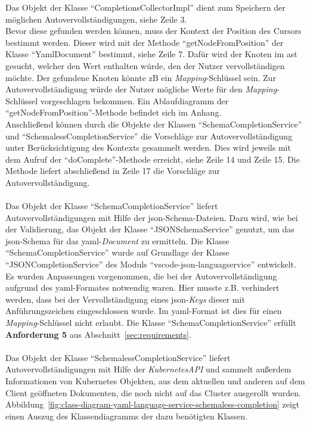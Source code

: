 Das Objekt der Klasse ``CompletionsCollectorImpl'' dient zum Speichern der möglichen Autovervollständigungen, siehe Zeile 3.
\\
Bevor diese gefunden werden können, muss der Kontext der Position des Cursors bestimmt werden.
Dieser wird mit der Methode ``getNodeFromPosition'' der Klasse ``YamlDocument'' bestimmt, siehe Zeile 7.
Dafür wird der Knoten im \ac{ast} gesucht, welcher den Wert enthalten würde, den der Nutzer vervollständigen möchte.
Der gefundene Knoten könnte \ac{zB} ein \textit{Mapping}-Schlüssel sein.
Zur Autovervollständigung würde der Nutzer mögliche Werte für den \textit{Mapping}-Schlüssel vorgeschlagen bekommen.
Ein Ablaufdiagramm der ``getNodeFromPosition''-Methode befindet sich im Anhang.
\\
Anschließend können durch die Objekte der Klassen ``SchemaCompletionService'' und ``SchemalessCompletionService''
die Vorschläge zur Autovervollständigung unter Berücksichtigung des Kontexts gesammelt werden.
Dies wird jeweils mit dem Aufruf der ``doComplete''-Methode erreicht, siehe Zeile 14 und Zeile 15.
Die Methode liefert abschließend in Zeile 17 die Vorschläge zur Autovervollständigung.
\\
\\
Das Objekt der Klasse ``SchemaCompletionService'' liefert Autovervollständigungen mit Hilfe der \ac{json}-Schema-Dateien.
Dazu wird, wie bei der Validierung, das Objekt der Klasse ``JSONSchemaService'' genutzt, um das \ac{json}-Schema für das \ac{yaml}-\textit{Document}
zu ermitteln. Die Klasse ``SchemaCompletionService'' wurde auf Grundlage der Klasse ``JSONCompletionService'' des Moduls ``vscode-json-languagservice''
entwickelt. Es wurden Anpassungen vorgenommen, die bei der Autovervollständigung aufgrund des \ac{yaml}-Formates notwendig waren.
Hier musste z.B. verhindert werden, dass bei der Vervollständigung eines \ac{json}-\textit{Keys} dieser mit Anführungszeichen eingeschlossen wurde.
Im \ac{yaml}-Format ist dies für einen \textit{Mapping}-Schlüssel nicht erlaubt.
Die Klasse ``SchemaCompletionService'' erfüllt \textbf{Anforderung 5} aus Abschnitt~\ref{sec:requirements}.
\\
\\
Das Objekt der Klasse ``SchemalessCompletionService'' liefert Autovervollständigungen mit Hilfe der \textit{KubernetesAPI} und
sammelt außerdem Informationen von Kubernetes Objekten, aus dem aktuellen und anderen auf dem Client geöffneten Dokumenten, die noch nicht auf das
Cluster ausgerollt wurden.
Abbildung~\ref{fig:class-diagram-yaml-language-service-schemaless-completion} zeigt einen Auszug des Klassendiagramms der dazu benötigten Klassen.

